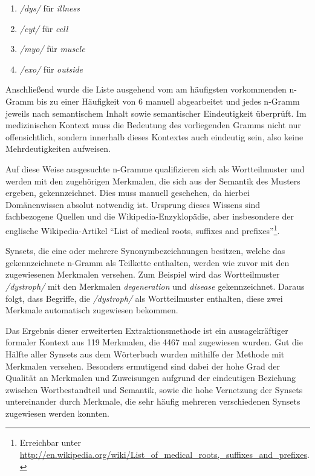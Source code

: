 \documentclass[pagesize,DIV=calc,12pt,final]{scrreprt}
\begin{document}
\begin{enumerate}
    \item \textit{/dys/} für \textit{illness}
    \item \textit{/cyt/} für \textit{cell}
    \item \textit{/myo/} für \textit{muscle}
    \item \textit{/exo/} für \textit{outside}
\end{enumerate}

Anschließend wurde die Liste ausgehend vom am häufigsten vorkommenden n-Gramm bis zu einer Häufigkeit von 6 manuell abgearbeitet und jedes n-Gramm jeweils nach semantischem Inhalt sowie semantischer Eindeutigkeit überprüft.
Im medizinischen Kontext muss die Bedeutung des vorliegenden Gramms nicht nur offensichtlich, sondern innerhalb dieses Kontextes auch eindeutig sein, also keine Mehrdeutigkeiten aufweisen. 

Auf diese Weise ausgesuchte n-Gramme qualifizieren sich als Wortteilmuster und werden mit den zugehörigen Merkmalen, die sich aus der Semantik des Musters ergeben, gekennzeichnet. 
Dies muss manuell geschehen, da hierbei Domänenwissen absolut notwendig ist. 
Ursprung dieses Wissens sind fachbezogene Quellen und die Wikipedia-Enzyklopädie, aber insbesondere der englische Wikipedia-Artikel \enquote{List of medical roots, suffixes and prefixes}\footnote{Erreichbar unter \href{http://en.wikipedia.org/wiki/List\_of\_medical\_roots,\_suffixes\_and\_prefixes}{http://en.wikipedia.org/wiki/List\_of\_medical\_roots,\_suffixes\_and\_prefixes}.}. 

Synsets, die eine oder mehrere Synonymbezeichnungen besitzen, welche das gekennzeichnete n-Gramm als Teilkette enthalten, werden wie zuvor mit den zugewiesenen Merkmalen versehen. 
Zum Beispiel wird das Wortteilmuster \emph{/dystroph/} mit den Merkmalen \textit{degeneration} und \textit{disease} gekennzeichnet. 
Daraus folgt, dass Begriffe, die \emph{/dystroph/} als Wortteilmuster enthalten, diese zwei Merkmale automatisch zugewiesen bekommen. 

Das Ergebnis dieser erweiterten Extraktionsmethode ist ein aussagekräftiger formaler Kontext aus 119 Merkmalen, die 4467 mal zugewiesen wurden. 
Gut die Hälfte aller Synsets aus dem Wörterbuch wurden mithilfe der Methode mit Merkmalen versehen. 
Besonders ermutigend sind dabei der hohe Grad der Qualität an Merkmalen und Zuweisungen aufgrund der eindeutigen Beziehung zwischen Wortbestandteil und Semantik, sowie die hohe Vernetzung der Synsets untereinander durch Merkmale, die sehr häufig mehreren verschiedenen Synsets zugewiesen werden konnten. 
\end{document}
